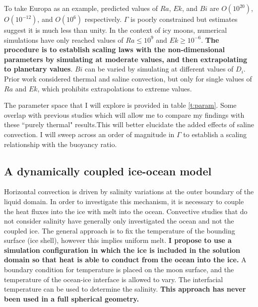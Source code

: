 \documentclass[12pt]{article}
\def\lb{\left(}
\def\rb{\right)}
\begin{document}

To take Europa as an example, predicted values of $Ra$,  $Ek$, and $Bi$ are $O\lb 10^{20}\rb $, $O\lb 10^{-12}\rb $, and $O\lb 10^{6}\rb $ respectively\citep{dL23}. $\Gamma$ is poorly constrained but estimates suggest it is much less than unity\citep{yA21}. In the context of icy moons, numerical simulations have only reached values of $Ra \le 10^{9}$ and $Ek \ge 10^{-6}$\citep{dL23}. 
\textbf{The procedure is to establish scaling laws with the non-dimensional parameters by simulating at moderate values, and then extrapolating to planetary values}. $Bi$ can be varied by simulating at different values of $D_{i}$. Prior work \citep{yA21} considered thermal and saline convection, but only for single values of $Ra$ and $Ek$, which prohibits extrapolations to extreme values.

The parameter space that I will explore is provided in table \ref{t:param}. Some overlap with previous studies\citep{dL23,kS19} which will allow me to compare my findings with these ``purely thermal" results.This will better elucidate the added effects of saline convection.
I will sweep across an order of magnitude in $\Gamma$ to establish a scaling relationship with the buoyancy ratio. 
\subsection{A dynamically coupled ice-ocean model}

Horizontal convection is driven by salinity variations at the outer boundary of the liquid domain. In order to investigate this mechanism, it is necessary to couple the heat fluxes into the ice with melt into the ocean. 
Convective studies that do not consider salinity have generally only investigated the ocean\citep{kS19,dL23} and not the coupled ice. The general approach is to fix the temperature of the bounding surface (ice shell), however this implies uniform melt.
\textbf{I propose to use a simulation configuration in which the ice is included in the solution domain so that heat is able to conduct from the ocean into the ice.} 
A boundary condition for temperature is placed on the moon surface, and the temperature of the ocean-ice interface is allowed to vary. The interfacial temperature can be used to determine the salinity\citep{wK22}.
\textbf{This approach has never been used in a full spherical geometry.}
\end{document}
